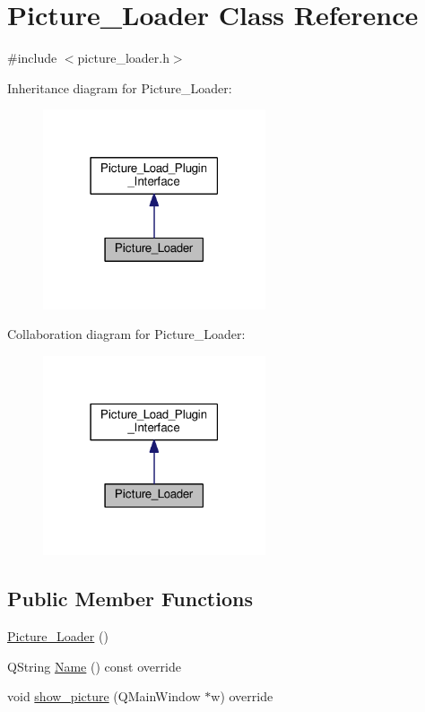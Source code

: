 \hypertarget{classPicture__Loader}{}\section{Picture\+\_\+\+Loader Class Reference}
\label{classPicture__Loader}


{\ttfamily \#include $<$picture\+\_\+loader.\+h$>$}



Inheritance diagram for Picture\+\_\+\+Loader\+:\nopagebreak
\begin{figure}[H]
\begin{center}
\leavevmode
\includegraphics[width=186pt]{classPicture__Loader__inherit__graph}
\end{center}
\end{figure}


Collaboration diagram for Picture\+\_\+\+Loader\+:\nopagebreak
\begin{figure}[H]
\begin{center}
\leavevmode
\includegraphics[width=186pt]{classPicture__Loader__coll__graph}
\end{center}
\end{figure}
\subsection*{Public Member Functions}
\begin{DoxyCompactItemize}
\item 
\hyperlink{classPicture__Loader_a632cf36df138f0b8bd94f514d61dfa95}{Picture\+\_\+\+Loader} ()
\item 
Q\+String \hyperlink{classPicture__Loader_a043165c946b7bf29dea761463b8cb5fa}{Name} () const override
\item 
void \hyperlink{classPicture__Loader_af4127aaea7066112b2368adda46a82b0}{show\+\_\+picture} (Q\+Main\+Window $\ast$w) override
\end{DoxyCompactItemize}


